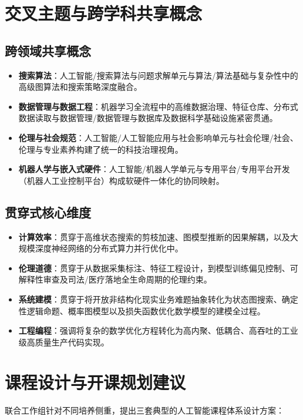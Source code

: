 \section{交叉主题与跨学科共享概念}

\subsection{跨领域共享概念}
\begin{itemize}
    \item \textbf{搜索算法}：人工智能/搜索算法与问题求解单元与算法/算法基础与复杂性中的高级图算法和搜索策略深度融合。
    \item \textbf{数据管理与数据工程}：机器学习全流程中的高维数据治理、特征仓库、分布式数据读取与数据管理/数据管理与数据库及数据科学基础设施紧密贯通。
    \item \textbf{伦理与社会规范}：人工智能/人工智能应用与社会影响单元与社会伦理/社会、伦理与专业素养构建了统一的科技治理视角。
    \item \textbf{机器人学与嵌入式硬件}：人工智能/机器人学单元与专用平台/专用平台开发（机器人工业控制平台）构成软硬件一体化的协同映射。
\end{itemize}

\subsection{贯穿式核心维度}
\begin{itemize}
    \item \textbf{计算效率}：贯穿于高维状态搜索的剪枝加速、图模型推断的因果解耦，以及大规模深度神经网络的分布式算力并行优化中。
    \item \textbf{伦理道德}：贯穿于从数据采集标注、特征工程设计，到模型训练偏见控制、可解释性审查及司法/医疗落地全生命周期的伦理约束。
    \item \textbf{系统建模}：贯穿于将开放非结构化现实业务难题抽象转化为状态图搜索、确定性逻辑命题、概率图模型以及损失函数优化数学模型的建模全过程。
    \item \textbf{工程编程}：强调将复杂的数学优化方程转化为高内聚、低耦合、高吞吐的工业级高质量生产代码实现。
\end{itemize}

\section{课程设计与开课规划建议}

联合工作组针对不同培养侧重，提出三套典型的人工智能课程体系设计方案：

